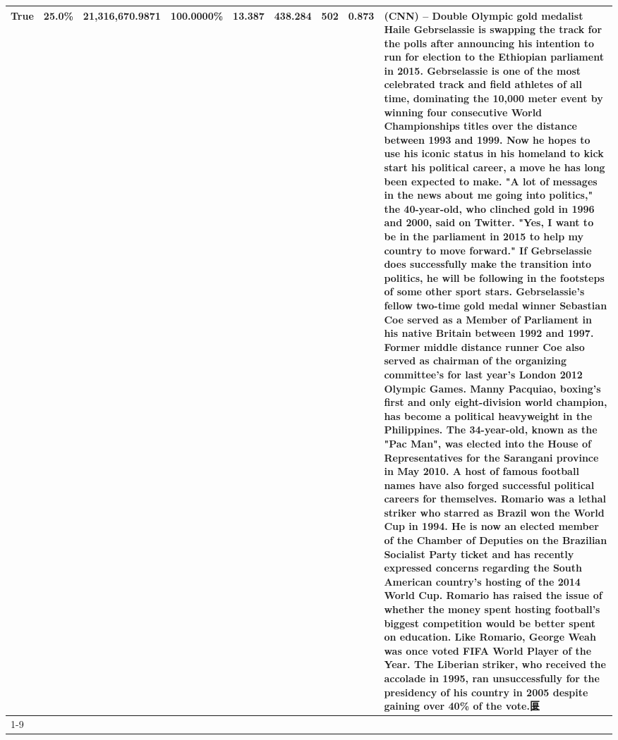 \begin{table}[H]
{\begin{tabular}{lllrlllll}
True & 25.0\% & 21,316,670.9871 & \bfseries \color{red} 100.0000\% & 13.387 & 438.284 & 502 & 0.873 & (CNN) -- Double Olympic gold medalist Haile Gebrselassie is swapping the track for the polls after announcing his intention to run for election to the Ethiopian parliament in 2015. Gebrselassie is one of the most celebrated track and field athletes of all time, dominating the 10,000 meter event by winning four consecutive World Championships titles over the distance between 1993 and 1999. Now he hopes to use his iconic status in his homeland to kick start his political career, a move he has long been expected to make. "A lot of messages in the news about me going into politics," the 40-year-old, who clinched gold in 1996 and 2000, said on Twitter. "Yes, I want to be in the parliament in 2015 to help my country to move forward." If Gebrselassie does successfully make the transition into politics, he will be following in the footsteps of some other sport stars. Gebrselassie's fellow two-time gold medal winner Sebastian Coe served as a Member of Parliament in his native Britain between 1992 and 1997. Former middle distance runner Coe also served as chairman of the organizing committee's for last year's London 2012 Olympic Games. Manny Pacquiao, boxing's first and only eight-division world champion, has become a political heavyweight in the Philippines. The 34-year-old, known as the "Pac Man", was elected into the House of Representatives for the Sarangani province in May 2010. A host of famous football names have also forged successful political careers for themselves. Romario was a lethal striker who starred as Brazil won the World Cup in 1994. He is now an elected member of the Chamber of Deputies on the Brazilian Socialist Party ticket and has recently expressed concerns regarding the South American country's hosting of the 2014 World Cup. Romario has raised the issue of whether the money spent hosting football's biggest competition would be better spent on education. Like Romario, George Weah was once voted FIFA World Player of the Year. The Liberian striker, who received the accolade in 1995, ran unsuccessfully for the presidency of his country in 2005 despite gaining over 40\% of the vote.匽 \\
\cline{1-9}

\end{tabular}}
\end{table}
